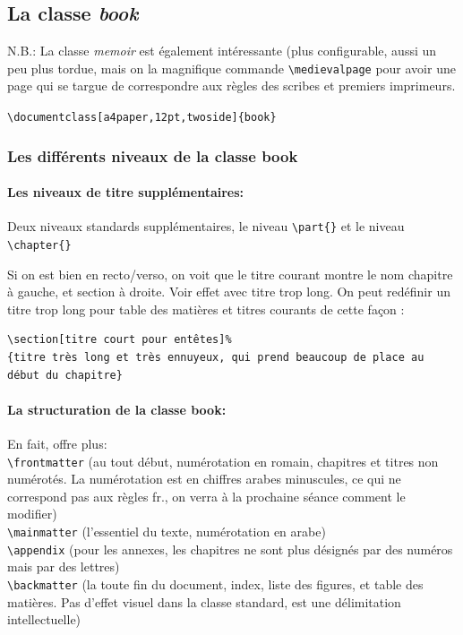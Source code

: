 \documentclass[a4paper,twoside,french,12pt]{article}
\begin{document}
\subsection{La classe \textit{book}}

N.B.: La classe \textit{memoir} est également intéressante (plus configurable, aussi un peu plus tordue, mais on la magnifique commande \verb=\medievalpage= pour avoir une page qui se targue de correspondre aux règles des scribes et premiers imprimeurs.

\verb=\documentclass[a4paper,12pt,twoside]{book}=


\subsubsection{Les différents niveaux de la classe book}


\paragraph{Les niveaux de titre supplémentaires:}

Deux niveaux standards supplémentaires, le niveau \verb=\part{}= et le niveau \verb=\chapter{}=

Si on est bien en recto/verso, on voit que le titre courant montre le nom chapitre à gauche, et section à droite.
Voir effet avec titre trop long. On peut redéfinir un titre trop long pour table des matières et titres courants de cette façon :
\begin{verbatim}
\section[titre court pour entêtes]%
{titre très long et très ennuyeux, qui prend beaucoup de place au début du chapitre}
\end{verbatim}

\paragraph{La structuration de la classe book:}
En fait, offre plus:\\
\verb=\frontmatter= (au tout début, numérotation en romain, chapitres et titres non numérotés. La numérotation est en chiffres arabes minuscules, ce qui ne correspond pas aux règles fr., on verra à la prochaine séance comment le modifier)\\
\verb=\mainmatter= (l'essentiel du texte, numérotation en arabe)\\
\verb=\appendix= (pour les annexes, les chapitres ne sont plus désignés par des numéros mais par des lettres)\\
\verb=\backmatter= (la toute fin du document, index, liste des figures, et table des matières. Pas d'effet visuel dans la classe standard, est une délimitation intellectuelle)\\
\end{document}
